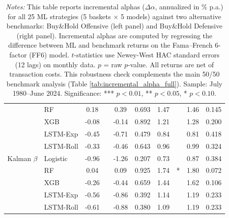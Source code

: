 \begin{table}[htbp]
{\begin{tabular}{l l S[table-format=2.2] l S[table-format=1.2] S[table-format=1.3] S[table-format=2.2] l S[table-format=1.2] S[table-format=1.3]}
 & RF & {0.18} &  & {0.39} & 0.693 & {1.47} &  & {1.46} & 0.145 \\
 & XGB & {-0.08} &  & {-0.14} & 0.892 & {1.21} &  & {1.28} & 0.200 \\
 & LSTM-Exp & {-0.45} &  & {-0.71} & 0.479 & {0.84} &  & {0.81} & 0.418 \\
 & LSTM-Roll & {-0.33} &  & {-0.46} & 0.643 & {0.96} &  & {0.99} & 0.324 \\
\midrule
Kalman $\beta$ & Logistic & {-0.96} &  & {-1.26} & 0.207 & {0.73} &  & {0.87} & 0.384 \\
 & RF & {0.04} &  & {0.09} & 0.925 & {1.74} & * & {1.80} & 0.072 \\
 & XGB & {-0.26} &  & {-0.44} & 0.659 & {1.44} &  & {1.62} & 0.106 \\
 & LSTM-Exp & {-0.56} &  & {-0.86} & 0.392 & {1.14} &  & {1.19} & 0.233 \\
 & LSTM-Roll & {-0.61} &  & {-0.88} & 0.380 & {1.09} &  & {1.19} & 0.233 \\
\bottomrule
\end{tabular}%
}
\caption*{\footnotesize \textit{Notes:} This table reports incremental alphas ($\Delta\alpha$, annualized in \% p.a.) for all 25 ML strategies (5 baskets $\times$ 5 models) against two alternative benchmarks: Buy\&Hold Offensive (left panel) and Buy\&Hold Defensive (right panel). Incremental alphas are computed by regressing the difference between ML and benchmark returns on the Fama--French 6-factor (FF6) model. $t$-statistics use Newey-West HAC standard errors (12 lags) on monthly data. $p$ = raw $p$-value. All returns are net of transaction costs. This robustness check complements the main 50/50 benchmark analysis (Table \ref{tab:incremental_alpha_full}). Sample: July 1980--June 2024. Significance: *** $p<0.01$, ** $p<0.05$, * $p<0.10$.}
\end{table}